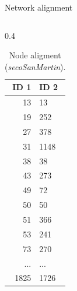 \documentclass[aspectratio=169]{beamer}
\begin{document}
    \begin{frame}{Network alignment}
        \begin{columns}[t] %
            \begin{column}{0.4\textwidth}
                \begin{table}[htp!]
                    \scriptsize
                    \centering
                    \caption{Node aligment (\textit{secoSanMartin}).}
                    \begin{tabular}{rl}\toprule
                        ID 1 & ID 2 \\\midrule
                        \rowcolor{yellow}
                        13 & 13 \\
                        19 & 252 \\
                        27 & 378 \\
                        31 & 1148 \\
                        \rowcolor{yellow}
                        38 & 38 \\
                        43 & 273 \\
                        49 & 72 \\
                        \rowcolor{yellow}
                        50 & 50 \\
                        51 & 366 \\
                        53 & 241 \\
                        73 & 270 \\
                        ... & ... \\
                        1825 & 1726 \\\bottomrule
                    \end{tabular}
                \end{table}
            \end{column}
            

\end{columns}
\end{frame}
\end{document}
